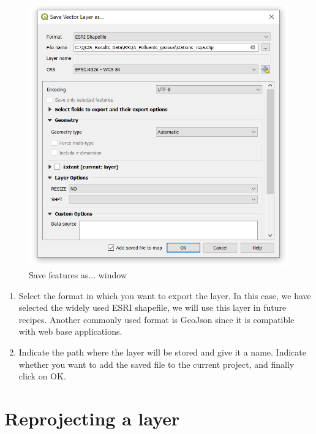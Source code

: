 \documentclass[]{book}
\theoremstyle{definition}
\theoremstyle{definition}
\theoremstyle{definition}
\theoremstyle{remark}
\begin{document}
\begin{figure}

{\centering \includegraphics[width=9.78in]{figures/Save_Layer} 

}

\caption{Save features as... window}\label{fig:unnamed-chunk-9}
\end{figure}

\begin{enumerate}
\def\labelenumi{\arabic{enumi}.}
\setcounter{enumi}{1}
\item
  Select the format in which you want to export the layer. In this case,
  we have selected the widely used ESRI shapefile, we will use this
  layer in future recipes. Another commonly used format is GeoJson since
  it is compatible with web base applications.
\item
  Indicate the path where the layer will be stored and give it a name.
  Indicate whether you want to add the saved file to the current
  project, and finally click on OK.
\end{enumerate}

\section{Reprojecting a layer}\label{reprojecting-a-layer}
\end{document}
